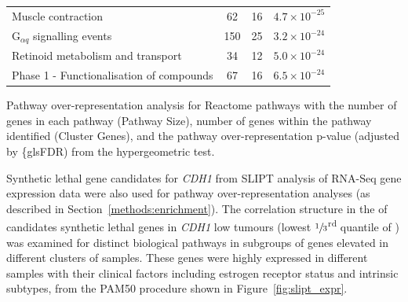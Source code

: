 \begin{table}[!hp]
{\begin{threeparttable}
\begin{tabular}{lccc}
  \rowcolor{Cluster_Red!20} 
  Muscle contraction &  62 &  16 & $4.7 \times 10^{-25}$ \\
  \rowcolor{Cluster_Red!15} 
  G$_{\alpha q}$ signalling events & 150 &  25 & $3.2 \times 10^{-24}$ \\
  \rowcolor{Cluster_Red!20} 
  Retinoid metabolism and transport &  34 &  12 & $5.0 \times 10^{-24}$ \\
  \rowcolor{Cluster_Red!15} 
  Phase 1 - Functionalisation of compounds &  67 &  16 & $6.5 \times 10^{-24}$ \\
  \hline
\end{tabular}
\begin{tablenotes}
\raggedright %
Pathway over-representation analysis for Reactome pathways with the number of genes in each pathway (Pathway Size), number of genes within the pathway identified (Cluster Genes), and the pathway over-representation p-value (adjusted by \{gls{FDR}) from the hypergeometric test.  
\end{tablenotes}
\end{threeparttable}
}
\end{table}

Synthetic lethal gene candidates for \textit{CDH1} from \gls{SLIPT} analysis of \acrshort{RNA}-Seq \gls{gene expression} data were also used for pathway over-representation analyses (as described in Section~\ref{methods:enrichment}). The correlation structure in the  of candidates \gls{synthetic lethal} genes in \textit{CDH1} low tumours (lowest $\sfrac{1}{3}$\textsuperscript{rd} quantile of ) was examined for distinct biological pathways in subgroups of genes elevated in different clusters of samples. These genes were highly expressed in different samples with their clinical factors including estrogen receptor status and \glspl{intrinsic subtype}, from the \gls{PAM50} procedure \citep{Parker2009} shown in Figure~\ref{fig:slipt_expr}.

